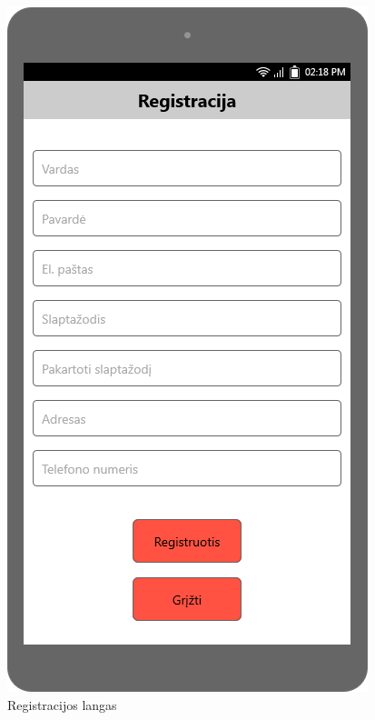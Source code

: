\documentclass{VUMIFPSbakalaurinis}
\begin{document}
\begin{figure}[H]
	\centering
	\includegraphics[scale=0.4]{img/ScreenShots/02-Registracijos-langas}
	\caption{Registracijos langas}
	\label{img:reg}
\end{figure}
\end{document}

